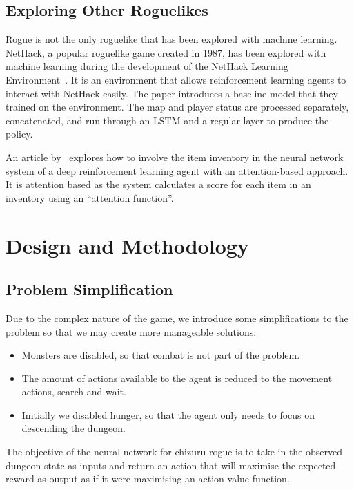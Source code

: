 \documentclass[12pt,a4paper]{article}
\begin{document}
    \subsection{Exploring Other Roguelikes}\label{subsec:exploring-other-roguelikes}
    Rogue is not the only roguelike that has been explored with machine learning.
    NetHack, a popular roguelike game created in 1987, has been explored with machine learning during the development of the NetHack Learning Environment~\citep{kuttler20}.
    It is an environment that allows reinforcement learning agents to interact with NetHack easily.
    The paper introduces a baseline model that they trained on the environment.
    The map and player status are processed separately, concatenated, and run through an LSTM and a regular layer to produce the policy.

    An article by~\citet{izumiya21} explores how to involve the item inventory in the neural network system of a deep reinforcement learning agent with an attention-based approach.
    It is attention based as the system calculates a score for each item in an inventory using an ``attention function''.

    \section{Design and Methodology}\label{sec:design-and-methodology}
    \subsection{Problem Simplification}\label{subsec:problem-simplification}
    Due to the complex nature of the game, we introduce some simplifications to the problem so that
    we may create more manageable solutions.

    \begin{itemize}
        \item Monsters are disabled, so that combat is not part of the problem.
        \item The amount of actions available to the agent is reduced to the movement actions, search and wait.
        \item Initially we disabled hunger, so that the agent only needs to focus on descending the dungeon.
    \end{itemize}

    The objective of the neural network for chizuru-rogue is to take in the observed dungeon state as inputs and return an action that will maximise the expected reward as output as if it were maximising an action-value function.
\end{document}
